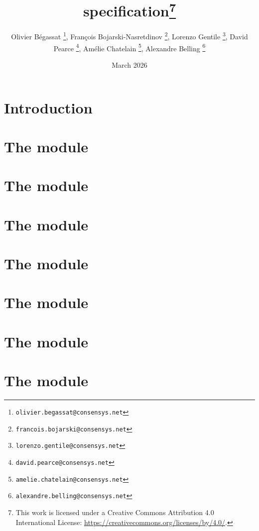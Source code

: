 \documentclass[fleqn]{report}
\title{\linea{} \zkEvm{} specification\thanks{This work is licensed under a Creative Commons Attribution 4.0 International License: \url{https://creativecommons.org/licenses/by/4.0/}.}}
\author{%
    Olivier Bégassat \thanks{\texttt{olivier.begassat@consensys.net}},
    François Bojarski-Nasretdinov \thanks{\texttt{francois.bojarski@consensys.net}},
    Lorenzo Gentile \thanks{\texttt{lorenzo.gentile@consensys.net}},
    David Pearce \thanks{\texttt{david.pearce@consensys.net}},
    Amélie Chatelain \thanks{\texttt{amelie.chatelain@consensys.net}},
    Alexandre Belling \thanks{\texttt{alexandre.belling@consensys.net}}
}
\date{March 2026}
\begin{document}
\maketitle
\setcounter{tocdepth}{0}
\dominitoc
{\makeatletter\let\@mkboth\@gobbletwo\makeatother\tableofcontents}

\setcounter{tocdepth}{4}

\chapter*{Introduction}                              \label{chap: spec intro}      \minitoc    
\chapter{The \hubMod{} module}                       \label{chap: hub}             \minitoc    
\chapter{The \mmuMod{} module}                       \label{chap: mmu}             \minitoc    
\chapter{The \mmioMod{} module}                      \label{chap: ram}             \minitoc    
\chapter{The \romMod{} module}                       \label{chap: rom}             \minitoc    
\chapter{The \romLexMod{} module}                    \label{chap: rom lex}         \minitoc    
\chapter{The \oobMod{} module}                       \label{chap: oob}             \minitoc    
\chapter{The \mxpMod{} module}                       \label{chap: mxp}             \minitoc    
\end{document}

